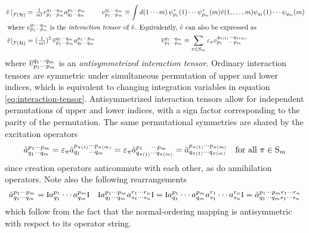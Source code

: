 \documentclass[11pt]{article}
\numberwithin{equation}{section}
\begin{document}
\begin{ntt}
\begin{align}\label{eq:interaction-tensor}
  \left.
  \op{v}\,
  \right|_{\mc{F}(\mc{H})}
=&\
  \tfr{1}{m!}
  v_{p_1\cd p_m}^{q_1\cd q_m}
  a^{p_1\cd p_m}_{q_1\cd q_m}
&
  v_{p_1\cd p_m}^{q_1\cd q_m}
\equiv
  \int
  d(1\cd m)\,
  \y_{p_1}^*(1)\cd \y_{p_m}^*(m)
  \op{v}(1,\ld,m)
  \y_{q_1}(1)\cd \y_{q_m}(m)
&
\\
\intertext{
where $v_{p_1\cd p_m}^{q_1\cd q_m}$ is the \textit{interaction tensor} of $\op{v}$.
Equivalently, $\op{v}$ can also be expressed as
}
\label{eq:antisymmetrized-interaction-tensor}
  \left.
  \op{v}
  \right|_{\mc{F}(\mc{H})}
=&\
  (\tfr{1}{m!})^2\,
  \ol{v}_{p_1\cd p_m}^{q_1\cd q_m}
  a^{p_1\cd p_m}_{q_1\cd q_m}
&
  \ol{v}_{p_1\cd p_m}^{q_1\cd q_m}
\equiv
  \sum_{\pi\in\mr{S}_m}
  \e_\pi
  v_{p_1\hphantom{_{\pi()}}\cd p_m}^{q_{\pi(1)}\cd q_{\pi(m)}}
\hspace{3cm}&
\end{align}
where $\overline{v}_{p_1\cdots p_m}^{q_1\cdots q_m}$ is an \textit{antisymmetrized interaction tensor}.
Ordinary interaction tensors are symmetric under simultaneous permutation of upper and lower indices, which is equivalent to changing integration variables in equation \ref{eq:interaction-tensor}.
Antisymmetrized interaction tensors allow for independent permutations of upper and lower indices, with a sign factor corresponding to the parity of the permutation.
The same permutational symmetries are shared by the excitation operators
\begin{align}\label{eq:excitation-permutational-symmetries-1}
  \tl{a}^{p_1\cd p_m}_{q_1\cd q_m}
=
  \e_{\pi}
  \tl{a}^{p_{\pi(1)}\cd p_{\pi(m)}}_{q_1\hphantom{_{\pi()}}\cd q_m}
=
  \e_{\pi}
  \tl{a}^{p_1\hphantom{_{\pi()}}\cd p_m}_{q_{\pi(1)}\cd q_{\pi(m)}}
=
  \tl{a}^{p_{\pi(1)}\cd p_{\pi(m)}}_{q_{\pi(1)}\cd q_{\pi(m)}}
&&
  \text{for all $\pi\in\mr{S}_m$}
\end{align}
since creation operators anticommute with each other, as do annihilation operators.
Note also the following rearrangements
\begin{align}\label{eq:excitation-permutational-symmetries-2}
  \tl{a}^{p_1\cd p_m}_{q_1\cd q_m}
=
  \gno{a^{p_1}_{q_1}\cd a^{p_m}_{q_m}}
&&
  \gno{a^{p_1\cd p_m}_{q_1\cd q_m}a^{r_1\cd r_n}_{s_1\cd s_n}}
=
  \gno{a^{p_1}_{q_1}\cd a^{p_m}_{q_m}a^{r_1}_{s_1}\cd a^{r_n}_{s_n}}
=
  \tl{a}^{p_1\cd p_mr_1\cd r_n}_{q_1\cd q_ms_1\cd s_n}
\end{align}
which follow from the fact that the normal-ordering mapping is antisymmetric with respect to its operator string.
\end{ntt}
\end{document}
